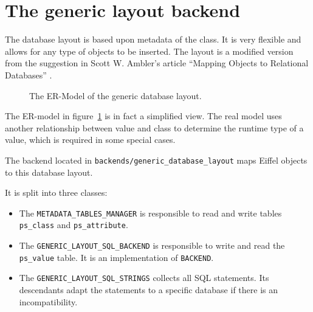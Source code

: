 \documentclass[a4paper,12pt]{report}
\begin{document}
\section{The generic layout backend}

The database layout is based upon metadata of the class. 
It is very flexible and allows for any type of objects to be inserted.
The layout is a modified version from the suggestion in Scott W. Ambler's article ``Mapping Objects to Relational Databases'' \cite{AmblerORM}.

\begin{figure} [!ht]
\centering
{}
\caption{The ER-Model of the generic database layout.}
\label{fig:er_model_generic_layout}
\end{figure}

The ER-model in figure~\ref{fig:er_model_generic_layout} is in fact a simplified view. 
The real model uses another relationship between value and class to determine the runtime type of a value, which is required in some special cases.

The backend located in \lstinline!backends/generic_database_layout! maps Eiffel objects to this database layout.

It is split into three classes:
\begin{itemize}
 \item The \lstinline!METADATA_TABLES_MANAGER! is responsible to read and write tables \lstinline!ps_class! and \lstinline!ps_attribute!.
 \item The \lstinline!GENERIC_LAYOUT_SQL_BACKEND! is responsible to write and read the \lstinline!ps_value! table. It is an implementation of \lstinline!BACKEND!.
 \item The \lstinline!GENERIC_LAYOUT_SQL_STRINGS! collects all SQL statements. Its descendants adapt the statements to a specific database if there is an incompatibility.
\end{itemize}
\end{document}
